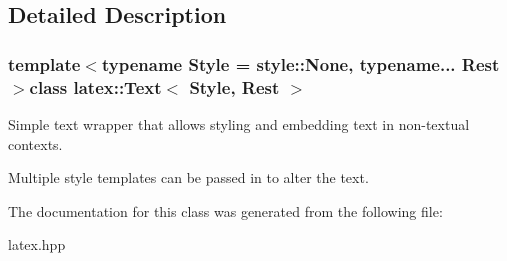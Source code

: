 \subsection{\-Detailed \-Description}
\subsubsection*{template$<$typename Style = style\-::\-None, typename... \-Rest$>$class latex\-::\-Text$<$ Style, Rest $>$}

\-Simple text wrapper that allows styling and embedding text in non-\/textual contexts.

\-Multiple style templates can be passed in to alter the text. 

\-The documentation for this class was generated from the following file\-:\begin{DoxyCompactItemize}
\item 
latex.\-hpp\end{DoxyCompactItemize}
